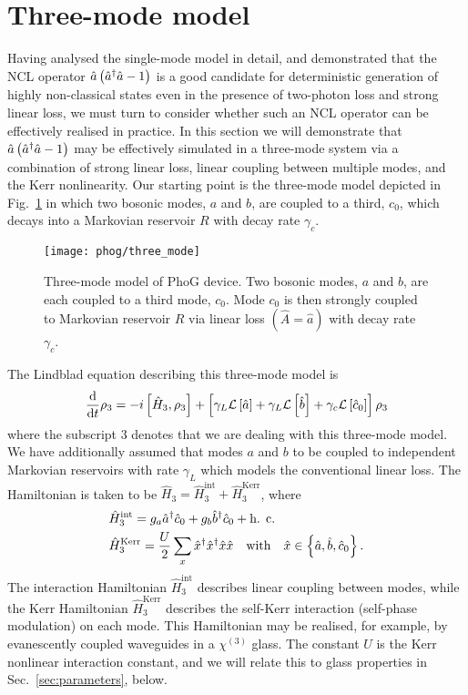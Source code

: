 \clearpage
\section{Three-mode model}\label{sec:phog_three_mode_model}
Having analysed the single-mode model in detail, and demonstrated that the NCL operator $\hat{a}\left(\hat{a}^\dagger \hat{a} - 1\right)$ is a good candidate for deterministic generation of highly non-classical states even in the presence of two-photon loss and strong linear loss, we must turn to consider whether such an NCL operator can be effectively realised in practice. In this section we will demonstrate that $\hat{a}\left(\hat{a}^\dagger \hat{a} - 1\right)$ may be effectively simulated in a three-mode system via a combination of strong linear loss, linear coupling between multiple modes, and the Kerr nonlinearity. Our starting point is the three-mode model depicted in Fig.~\ref{fig:phog_three_mode} in which two bosonic modes, $a$ and $b$, are coupled to a third, $c_0$, which decays into a Markovian reservoir $R$ with decay rate $\gamma_c$. 

\begin{figure}[htp]
\centering
\texttt{[image: phog/three\_mode]}
\caption{\label{fig:phog_three_mode} Three-mode model of PhoG device. Two bosonic modes, $a$ and $b$, are each coupled to a third mode, $c_0$. Mode $c_0$ is then strongly coupled to Markovian reservoir $R$ via linear loss $\left(\hat{A} = \hat{a}\right)$ with decay rate $\gamma_c$. }
\end{figure}

The Lindblad equation describing this three-mode model is
\begin{equation}\label{eqn:phog_lindblad_three_mode_model}
\frac{\mathrm{d}}{\mathrm{d}t} \rho_3 = - i \left[ \hat{H}_3, \rho_3\right] + \left[ \gamma_L \mathcal{L}\left[\hat{a}\right] + \gamma_L \mathcal{L}\left[\hat{b}\right] + \gamma_c \mathcal{L}\left[\hat{c}_0\right]\right] \rho_3
\end{equation}
where the subscript $3$ denotes that we are dealing with this three-mode model. We have additionally assumed that modes $a$ and $b$ to be coupled to independent Markovian reservoirs with rate $\gamma_L$ which models the conventional linear loss. The Hamiltonian is taken to be $\hat{H}_3 = \hat{H}_3^{\text{int}} + \hat{H}_3^{\text{Kerr}}$, where
\begin{align}\label{eqn:phog_three_mode_hamiltonian}
&\hat{H}_3^{\text{int}} = g_a \hat{a}^\dagger \hat{c}_0 + g_b \hat{b}^\dagger \hat{c}_0 + \hc \notag \\
%
&\hat{H}_3^{\text{Kerr}} = \frac{U}{2} \sum_{x} \hat{x}^\dagger \hat{x}^\dagger \hat{x} \hat{x} \qq{with} \hat{x} \in \left\{\hat{a}, \hat{b}, \hat{c}_0\right\}.
\end{align}
The interaction Hamiltonian $\hat{H}_3^{\text{int}}$ describes linear coupling between modes, while the Kerr Hamiltonian $\hat{H}_3^{\text{Kerr}}$ describes the self-Kerr interaction (self-phase modulation) %
on each mode. This Hamiltonian may be realised, for example, by evanescently coupled waveguides in a $\chi^{\left(3\right)}$ glass. The constant $U$ is the Kerr nonlinear interaction constant, and we will relate this to glass properties in Sec.~\ref{sec:parameters}, below.

